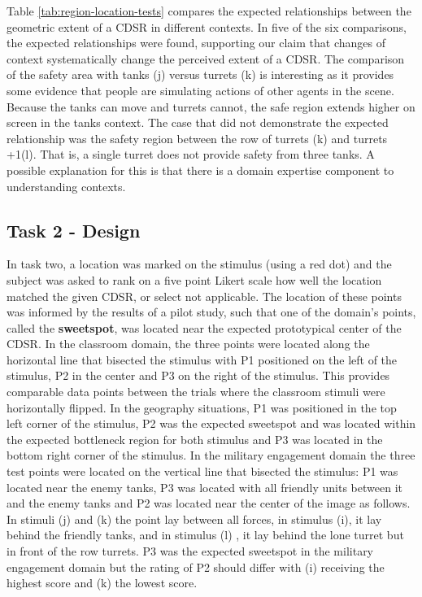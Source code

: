 \documentclass[11pt,letterpaper]{article}
\begin{document}
Table \ref{tab:region-location-tests} compares the expected relationships between the geometric extent of a CDSR in different contexts.  In five of the six comparisons, the expected relationships were found, supporting our claim that changes of context systematically change the perceived extent of a CDSR.  The comparison of the safety area with tanks (j) versus turrets (k) is interesting as it provides some evidence that people are simulating actions of other agents in the scene.  Because the tanks can move and turrets cannot, the safe region extends higher on screen in the tanks context.  The case that did not demonstrate the expected relationship was the safety region between the row of turrets (k) and turrets +1(l).  That is, a single turret does not provide safety from three tanks.  A possible explanation for this is that there is a domain expertise component to understanding contexts.


\subsection{Task 2 - Design} 
In task two, a location was marked on the stimulus (using a red dot) and the subject was asked to rank on a five point Likert scale how well the location matched the given CDSR, or select not applicable.  The location of these points was informed by the results of a pilot study, such that one of the domain's points, called the \textbf{sweetspot}, was located near the expected prototypical center of the CDSR. In the classroom domain, the three points were located along the horizontal line that bisected the stimulus with P1 positioned on the left of the stimulus, P2 in the center and P3 on the right of the stimulus. This provides comparable data points between the trials where the classroom stimuli were horizontally flipped.  In the geography situations, P1 was positioned in the top left corner of the stimulus, P2 was the expected sweetspot and was located within the expected bottleneck region for both stimulus and P3 was located in the bottom right corner of the stimulus.  In the military engagement domain the three test points were located on the vertical line that bisected the stimulus: P1 was located near the enemy tanks, P3 was located with all friendly units between it and the enemy tanks and P2 was located near the center of the image as follows. In stimuli (j) and (k) the point lay between all forces, in stimulus (i), it lay behind the friendly tanks, and in stimulus (l) , it lay behind the lone turret but in front of the row turrets.  P3 was the expected sweetspot in the military engagement domain but the rating of P2 should differ with (i) receiving the highest score and (k) the lowest score.
\end{document}

